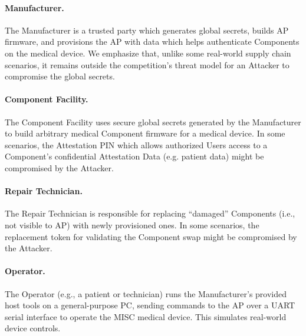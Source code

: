 \paragraph{Manufacturer.} The Manufacturer is a trusted party which generates global secrets, builds AP firmware, and provisions the AP with data which helps authenticate Components on the medical device. We emphasize that, unlike some real-world supply chain scenarios, it remains outside the competition's threat model for an Attacker to compromise the global secrets.

\paragraph{Component Facility.} The Component Facility uses secure global secrets generated by the Manufacturer to build arbitrary medical Component firmware for a medical device. In some scenarios, the Attestation PIN which allows authorized Users access to a Component's confidential Attestation Data (e.g. patient data) might be compromised by the Attacker.

\paragraph{Repair Technician.} The Repair Technician is responsible for replacing ``damaged'' Components (i.e., not visible to AP) with newly provisioned ones. In some scenarios, the replacement token for validating the Component swap might be compromised by the Attacker.

\paragraph{Operator.} The Operator (e.g., a patient or technician) runs the Manufacturer's provided host tools on a general-purpose PC, sending commands to the AP over a UART serial interface to operate the MISC medical device. This simulates real-world device controls.




